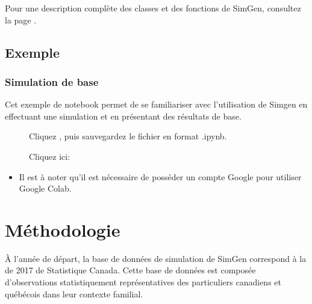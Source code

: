 \documentclass[letterpaper,10pt,french]{sphinxmanual}
\begin{document}
\begin{DUlineblock}{0em}
\item[] 
\end{DUlineblock}

Pour une description complète des classes et des fonctions de SimGen, consultez la page {\hyperref[\detokenize{code:code}]{}}.


\subsection{Exemple}
\label{\detokenize{utilisation:exemple}}

\subsubsection{Simulation de base}
\label{\detokenize{utilisation:simulation-de-base}}
Cet exemple de notebook permet de se familiariser avec l’utilisation de Simgen en effectuant une simulation
et en présentant des résultats de base.
\begin{description}
\item[{}] \leavevmode
Cliquez , puis sauvegardez le fichier en format .ipynb.

\item[{}] \leavevmode
Cliquez ici: 

\end{description}
\begin{itemize}
\item {} 
Il est à noter qu’il est nécessaire de posséder un compte Google pour utiliser Google Colab.

\end{itemize}


\section{Méthodologie}
\label{\detokenize{methodologie:methodologie}}\label{\detokenize{methodologie:transition-models}}\label{\detokenize{methodologie::doc}}
À l’année de départ, la base de données de simulation de SimGen correspond  à
la  de 2017 de Statistique Canada.
Cette base de données est composée
d’observations statistiquement représentatives des particuliers canadiens et québécois
dans leur contexte familial.
\end{document}

